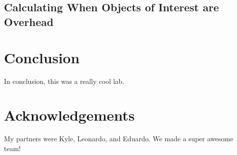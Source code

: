 \documentclass[11pt]{article}
\begin{document}
\subsection{Calculating When Objects of Interest are Overhead}

\section{Conclusion}
In conclusion, this was a really cool lab. 
\section{Acknowledgements}
My partners were Kyle, Leonardo, and Eduardo. We made a super awesome team!
\end{document}
